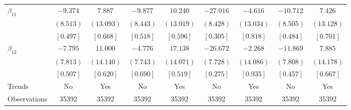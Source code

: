 \documentclass[12pt]{article}
\begin{document}
\begin{table}[h!]
\begin{adjustbox}{width=\textwidth}
\begin{tabular}{lcccccccc}
$\beta_{11}$ & $ -9.374$ & $  7.887$ & $ -9.877$ & $ 10.240$ & $-27.016$ & $ -4.616$ & $-10.712$ & $  7.426$ \\
& $(  8.513)$ & $( 13.093)$ & $(  8.443)$ & $( 13.019)$ & $(  8.428)$ & $( 13.034)$ & $(  8.505)$ & $( 13.128)$ \\
& $[  0.497]$ & $[  0.668]$ & $[  0.518]$ & $[  0.596]$ & $[  0.305]$ & $[  0.818]$ & $[  0.484]$ & $[  0.701]$ \\

$\beta_{12}$ & $ -7.795$ & $ 11.000$ & $ -4.776$ & $ 17.138$ & $-26.672$ & $ -2.268$ & $-11.869$ & $  7.885$ \\
& $(  7.813)$ & $( 14.140)$ & $(  7.743)$ & $( 14.071)$ & $(  7.728)$ & $( 14.086)$ & $(  7.808)$ & $( 14.178)$ \\
& $[  0.507]$ & $[  0.620]$ & $[  0.690]$ & $[  0.519]$ & $[  0.275]$ & $[  0.935]$ & $[  0.457]$ & $[  0.667]$ \\
\bottomrule
Trends & No & Yes & No & Yes & No & Yes & No & Yes \\
Observations & 35392 & 35392 & 35392 & 35392 & 35392 & 35392 & 35392 & 35392 \\
\bottomrule
\end{tabular}
\end{adjustbox}
\end{table}
\end{document}
